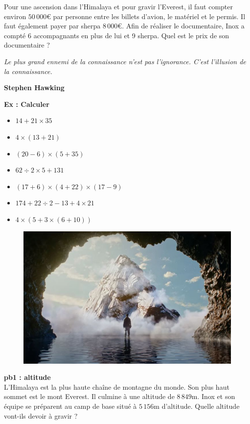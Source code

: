 Pour une ascension dans l’Himalaya et pour gravir l’Everest, il faut compter environ $50\,000$€ par personne entre les billets d'avion, le matériel et le permis. Il faut également payer par sherpa $8\,000$€. Afin de réaliser le documentaire, Inox a compté 6 accompagnants en plus de lui et 9 sherpa. Quel est le prix de son documentaire ?

\newpage

\begin{center}
  \textit{Le plus grand ennemi de la connaissance n'est pas l'ignorance. C'est l'illusion de la connaissance.} 
  
  \textbf{Stephen Hawking}
\end{center}

\textbf{Ex : Calculer} 

\begin{multicols}{2} \begin{itemize}[label={$\bullet$}]
  \item $14 + 21 \times 35$ 
  \item $4 \times (13 + 21)$ 
  \item $(20 - 6) \times (5 + 35)$
  \item $62 \div 2 \times 5 + 131$
  \item $(17 + 6) \times (4 + 22) \times (17 - 9)$
  \item $174 + 22 \div 2 - 13 + 4 \times 21$
  \item $4 \times ( 5 + 3 \times (6 + 10))$
\end{itemize} \end{multicols}


\begin{figure}[H]
  \centering
  \includegraphics[width=0.4\linewidth]{5x1-calcul-numerique/kaizen.jpg}
\end{figure}

\textbf{pb1 : altitude} \\

L'Himalaya est la plus haute chaîne de montagne du monde. Son plus haut sommet est le mont Everest. Il culmine à une altitude de $8\,849$m. Inox et son équipe se préparent au camp de base situé à $5\,156$m d'altitude. Quelle altitude vont-ils devoir à gravir ? \\


